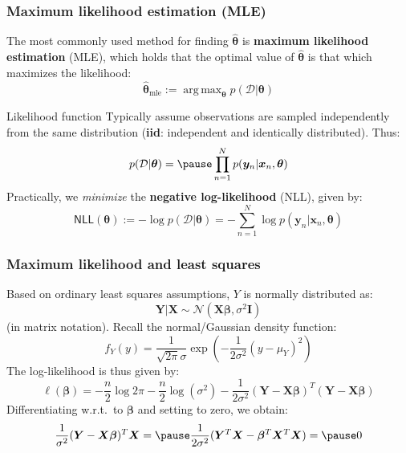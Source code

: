 \documentclass[smaller]{beamer}
\DeclareMathOperator*{\argmax}{arg\,max}
\newcommand{\lt}{\left}
\newcommand{\rt}{\right}
\newcommand{\?}{\stackrel{?}{=}}
\newcommand{\fr}{\frac}
\begin{document}
\begin{frame}
  \frametitle{ Maximum likelihood estimation (MLE)}
  \pause



  The most commonly used method for finding $\bm{\hat\theta}$ is \textbf{maximum likelihood estimation} (MLE),
  which holds that the optimal value of $\bm{\hat\theta}$ is that which maximizes the likelihood: \pause
  \begin{equation}
    \bm{\hat\theta}_{\mathrm{mle}} := \argmax_{\bm\theta} p(\mathcal{D}|\bm\theta)
  \end{equation}

  \begin{block}{Likelihood function}
    \pause
    Typically assume observations are sampled independently from the same distribution (\textbf{iid}: independent and identically distributed). Thus:
    \begin{equation}
      p(\mathcal{D}|\bm\theta) = \pause \prod_{n=1}^{N}p(\bm y_n|\bm x_n, \bm\theta)
    \end{equation}
    \pause
    Practically, we \textit{minimize} the \textbf{negative log-likelihood} (NLL), given by: \pause
    \begin{equation}
      \mathsf{NLL}(\bm\theta) := -\log p(\mathcal{D}|\bm\theta)  = -\sum_{n=1}^N\log p(\bm y_n|\bm x_n, \bm\theta)
    \end{equation}
  \end{block}
\end{frame}


\begin{frame}
  \frametitle{Maximum likelihood and least squares}
  \pause
  Based on ordinary least squares assumptions, $Y$ is normally distributed as:\pause
  \begin{equation}
    \bm Y| \bm X \sim \mathcal{N}(\bm X\bm\beta, \sigma^2\bm I)
  \end{equation}
  \pause
  (in matrix notation). \pause
  \bigskip
  Recall the normal/Gaussian density function:\pause
  \begin{equation}
    f_Y(y) = \fr1{\sqrt{2\pi}\sigma}\exp\lt(-\fr1{2\sigma^2}(y - \mu_Y)^2 \rt)
  \end{equation}
  \pause
  The log-likelihood is thus given by:\pause
  \begin{equation}
    \ell(\bm\beta) = -\fr n2\log2\pi -\fr n2\log(\sigma^2) -
    \fr1{2\sigma^2} (\bm Y - \bm{X\beta})^T(\bm Y - \bm{X\beta})
  \end{equation}
  \pause
  Differentiating w.r.t.\ to $\bm\beta$ and setting to zero, we obtain:\pause
  \begin{equation}
    \fr{1}{\sigma^2}(\bm Y - \bm{X\beta})^T{\bm X} = \pause     \fr{1}{2\sigma^2}(\bm Y^T\bm X - \bm\beta^T\bm X^T\bm X) = \pause 0
  \end{equation}
\end{frame}
\end{document}
